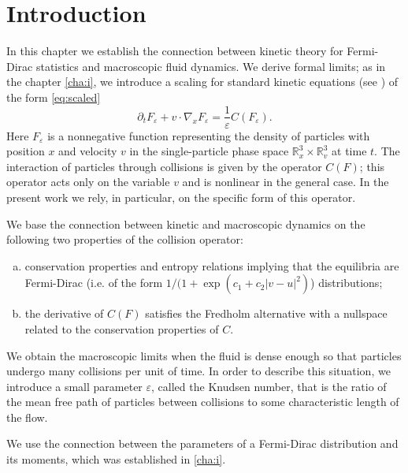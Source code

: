    \section{Introduction}
In this chapter we establish the connection between kinetic theory for Fermi-Dirac statistics and macroscopic fluid dynamics. We derive formal limits; as in the chapter \ref{cha:i}, we introduce a scaling for standard kinetic equations (see \cite{Landau1968Course}) of the form \eqref{eq:scaled}
\begin{equation*}%
\partial_t F_\varepsilon +v\cdot \nabla_xF_\varepsilon =\frac{1}{\varepsilon }C(F_\varepsilon ).
\end{equation*}
Here $F_\varepsilon$ is a nonnegative function representing the density of particles with position $x$ and velocity $v$ in the single-particle phase space $\mathbb R^3_x\times\mathbb R^3_v$ at time $t$. The interaction of particles through collisions is given by the operator $C(F)$; this operator acts only on the variable $v$ and is nonlinear in the general case. In the present work we rely, in particular, on the specific form of this operator.

We base the connection between kinetic and macroscopic dynamics on the following two properties of the collision operator:

\begin{enumerate}[(a)]
\item \label{item:conserv} conservation properties and entropy relations
implying that the equilibria are Fermi-Dirac (i.e. of the form
$1/(1+\exp(c_1+c_2|v-u|^2)$) distributions;
\item \label{item:derivative} the derivative of $C(F)$ satisfies the Fredholm alternative with a nullspace related to the conservation properties of $C$.
\end{enumerate}
We obtain the macroscopic limits when the fluid is dense enough so that particles undergo many collisions per unit of time. In order to describe this situation, we introduce a small parameter $\varepsilon$, called the Knudsen number, that is the ratio of the mean free path of particles between collisions to some characteristic length of the flow. 

We use the connection between the parameters of a Fermi-Dirac distribution and its moments, which was established in \ref{cha:i}.


